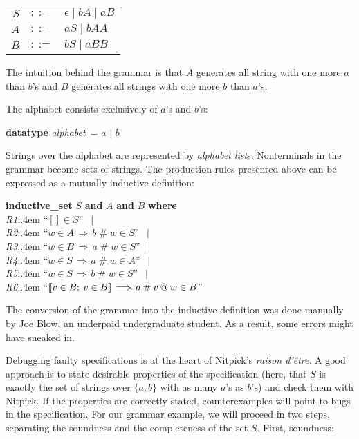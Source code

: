 \documentclass[a4paper,12pt]{article}
\begin{document}
\prew
\begin{tabular}{@{}r@{$\;\,$}c@{$\;\,$}l@{}}
$S$ & $::=$ & $\epsilon \mid bA \mid aB$ \\
$A$ & $::=$ & $aS \mid bAA$ \\
$B$ & $::=$ & $bS \mid aBB$
\end{tabular}
\postw

The intuition behind the grammar is that $A$ generates all string with one more
$a$ than $b$'s and $B$ generates all strings with one more $b$ than $a$'s.

The alphabet consists exclusively of $a$'s and $b$'s:

\prew
\textbf{datatype} \textit{alphabet}~= $a$ $\mid$ $b$
\postw

Strings over the alphabet are represented by \textit{alphabet list}s.
Nonterminals in the grammar become sets of strings. The production rules
presented above can be expressed as a mutually inductive definition:

\prew
\textbf{inductive\_set} $S$ \textbf{and} $A$ \textbf{and} $B$ \textbf{where} \\
\textit{R1}:\kern.4em ``$[] \in S$'' $\,\mid$ \\
\textit{R2}:\kern.4em ``$w \in A\,\Longrightarrow\, b \mathbin{\#} w \in S$'' $\,\mid$ \\
\textit{R3}:\kern.4em ``$w \in B\,\Longrightarrow\, a \mathbin{\#} w \in S$'' $\,\mid$ \\
\textit{R4}:\kern.4em ``$w \in S\,\Longrightarrow\, a \mathbin{\#} w \in A$'' $\,\mid$ \\
\textit{R5}:\kern.4em ``$w \in S\,\Longrightarrow\, b \mathbin{\#} w \in S$'' $\,\mid$ \\
\textit{R6}:\kern.4em ``$\mathopen{[\![} v \in B;\> v \in B\mathclose{]\!]} \,\Longrightarrow\, a \mathbin{\#} v \mathbin{@} w \in B$''
\postw

The conversion of the grammar into the inductive definition was done manually by
Joe Blow, an underpaid undergraduate student. As a result, some errors might
have sneaked in.

Debugging faulty specifications is at the heart of Nitpick's \textsl{raison
d'\^etre}. A good approach is to state desirable properties of the specification
(here, that $S$ is exactly the set of strings over $\{a, b\}$ with as many $a$'s
as $b$'s) and check them with Nitpick. If the properties are correctly stated,
counterexamples will point to bugs in the specification. For our grammar
example, we will proceed in two steps, separating the soundness and the
completeness of the set $S$. First, soundness:
\end{document}
